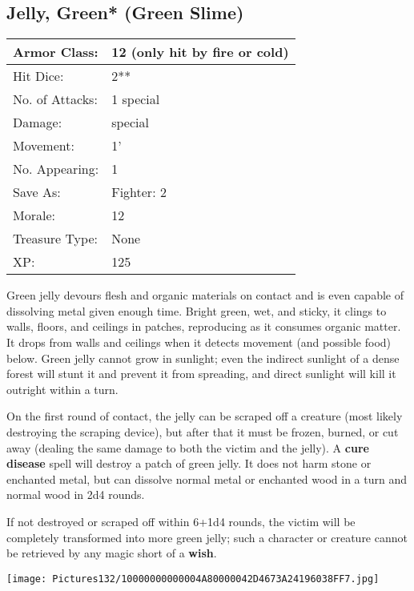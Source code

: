 \documentclass[a4paper,twoside,openany,10pt]{book}
\begin{document}
\begin{multicols}{2}
\subsection*{Jelly, Green* (Green Slime)}\label{jelly-green-green-slime}

\begin{tabularx}{0.50\textwidth}{@{}lX@{}}
Armor Class: & 12 (only hit by fire or cold) \\\hline
Hit Dice: & 2** \\\hline
No. of Attacks: & 1 special \\\hline
Damage: & special \\\hline
Movement: & 1' \\\hline
No. Appearing: & 1 \\\hline
Save As: & Fighter: 2 \\\hline
Morale: & 12 \\\hline
Treasure Type: & None \\\hline
XP: & 125 \\\hline
\end{tabularx}\medskip

Green jelly devours flesh and organic materials on contact and is even capable of dissolving metal given enough time. Bright green, wet, and sticky, it clings to walls, floors, and ceilings in patches, reproducing as it consumes organic matter. It drops from walls and ceilings when it detects movement (and possible food) below. Green jelly cannot grow in sunlight; even the indirect sunlight of a dense forest will stunt it and prevent it from spreading, and direct sunlight will kill it outright within a turn.

On the first round of contact, the jelly can be scraped off a creature (most likely destroying the scraping device), but after that it must be frozen, burned, or cut away (dealing the same damage to both the victim and the jelly). A \textbf{cure disease} spell will destroy a patch of green jelly. It does not harm stone or enchanted metal, but can dissolve normal metal or enchanted wood in a turn and normal wood in 2d4 rounds.

If not destroyed or scraped off within 6+1d4 rounds, the victim will be completely transformed into more green jelly; such a character or creature cannot be retrieved by any magic short of a \textbf{wish}.

\begin{center} \texttt{[image: Pictures132/10000000000004A80000042D4673A24196038FF7.jpg]} \end{center}



\end{multicols}
\end{document}
